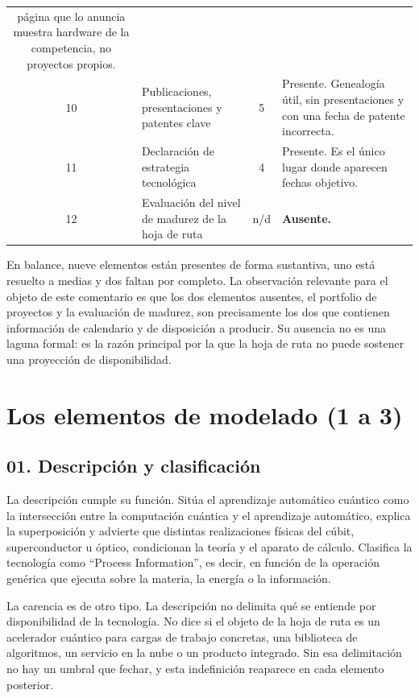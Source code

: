 \documentclass[11pt,letterpaper]{article}
\begin{document}
\begin{table}[ht]
\begin{tabularx}{\textwidth}{@{}c>{\raggedright\arraybackslash}p{}
    c>{\raggedright\arraybackslash}X@{}}
      página que lo anuncia muestra hardware de la competencia, no proyectos
      propios. \\
    10 & Publicaciones, presentaciones y patentes clave & 5 & Presente.
      Genealogía útil, sin presentaciones y con una fecha de patente
      incorrecta. \\
    11 & Declaración de estrategia tecnológica & 4 & Presente. Es el único
      lugar donde aparecen fechas objetivo. \\
    12 & Evaluación del nivel de madurez de la hoja de ruta & n/d &
      \textbf{Ausente.} \\
    \bottomrule
  \end{tabularx}
\end{table}

En balance, nueve elementos están presentes de forma sustantiva, uno está
resuelto a medias y dos faltan por completo. La observación relevante para el
objeto de este comentario es que los dos elementos ausentes, el portfolio de
proyectos y la evaluación de madurez, son precisamente los dos que contienen
información de calendario y de disposición a producir. Su ausencia no es una
laguna formal: es la razón principal por la que la hoja de ruta no puede
sostener una proyección de disponibilidad.

\section{Los elementos de modelado (1 a 3)}

\subsection*{01. Descripción y clasificación}

La descripción cumple su función. Sitúa el aprendizaje automático cuántico como
la intersección entre la computación cuántica y el aprendizaje automático,
explica la superposición y advierte que distintas realizaciones físicas del
cúbit, superconductor u óptico, condicionan la teoría y el aparato de cálculo.
Clasifica la tecnología como \enquote{Process Information}, es decir, en
función de la operación genérica que ejecuta sobre la materia, la energía o la
información.

La carencia es de otro tipo. La descripción no delimita qué se entiende por
disponibilidad de la tecnología. No dice si el objeto de la hoja de ruta es un
acelerador cuántico para cargas de trabajo concretas, una biblioteca de
algoritmos, un servicio en la nube o un producto integrado. Sin esa
delimitación no hay un umbral que fechar, y esta indefinición reaparece en cada
elemento posterior.
\end{document}
